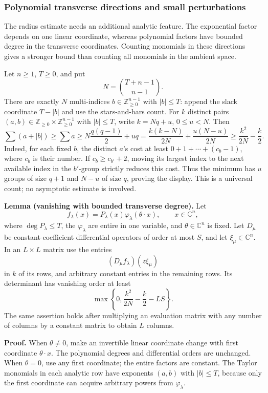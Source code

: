 \documentclass[
  11pt,
  a4paper,
]{article}
\begin{document}
\subsubsection{Polynomial transverse directions and small
perturbations}\label{polynomial-transverse-directions-and-small-perturbations}

The radius estimate needs an additional analytic feature. The
exponential factor depends on one linear coordinate, whereas polynomial
factors have bounded degree in the transverse coordinates. Counting
monomials in these directions gives a stronger bound than counting all
monomials in the ambient space.

Let \(n\ge1\), \(T\ge0\), and put \[
N=\binom{T+n-1}{n-1}.
\] There are exactly \(N\) multi-indices \(b\in\mathbb Z_{\ge0}^{n-1}\)
with \(|b|\le T\): append the slack coordinate \(T-|b|\) and use the
stars-and-bars count. For \(k\) distinct pairs
\((a,b)\in\mathbb Z_{\ge0}\times\mathbb Z_{\ge0}^{n-1}\) with
\(|b|\le T\), write \(k=Nq+u\), \(0\le u<N\). Then \[
\sum(a+|b|)\ge\sum a
\ge N\frac{q(q-1)}2+uq
=\frac{k(k-N)}{2N}+\frac{u(N-u)}{2N}
\ge\frac{k^2}{2N}-\frac k2.
\tag{8.168}
\] Indeed, for each fixed \(b\), the distinct \(a\)'s cost at least
\(0+1+\cdots+(c_b-1)\), where \(c_b\) is their number. If
\(c_b\ge c_{b'}+2\), moving its largest index to the next available
index in the \(b'\)-group strictly reduces this cost. Thus the minimum
has \(u\) groups of size \(q+1\) and \(N-u\) of size \(q\), proving the
display. This is a universal count; no asymptotic estimate is involved.

\textbf{Lemma (vanishing with bounded transverse degree).} Let \[
f_\lambda(x)=P_\lambda(x)\varphi_\lambda(\theta\cdot x),
\qquad x\in\mathbb C^n,
\] where \(\deg P_\lambda\le T\), the \(\varphi_\lambda\) are entire in
one variable, and \(\theta\in\mathbb C^n\) is fixed. Let \(D_\mu\) be
constant-coefficient differential operators of order at most \(S\), and
let \(\xi_\mu\in\mathbb C^n\). In an \(L\times L\) matrix use the
entries \[
(D_\mu f_\lambda)(z\xi_\mu)
\] in \(k\) of its rows, and arbitrary constant entries in the remaining
rows. Its determinant has vanishing order at least \[
\max\left\{0,\frac{k^2}{2N}-\frac k2-LS\right\}.
\tag{8.169}
\] The same assertion holds after multiplying an evaluation matrix with
any number of columns by a constant matrix to obtain \(L\) columns.

\textbf{Proof.} When \(\theta\ne0\), make an invertible linear
coordinate change with first coordinate \(\theta\cdot x\). The
polynomial degrees and differential orders are unchanged. When
\(\theta=0\), use any first coordinate; the entire factors are constant.
The Taylor monomials in each analytic row have exponents \((a,b)\) with
\(|b|\le T\), because only the first coordinate can acquire arbitrary
powers from \(\varphi_\lambda\).
\end{document}
